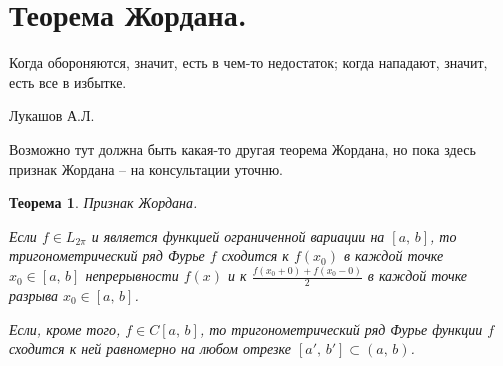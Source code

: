 \documentclass[a4paper,12pt]{article}
\theoremstyle{plain}
\newtheorem{theorem}{Теорема}[section]
\theoremstyle{definition}
\theoremstyle{remark}
\begin{document}
\section{Теорема Жордана.}

\epigraph{Когда обороняются, значит, есть в чем-то недостаток; когда нападают, значит, есть все в избытке.}{Лукашов А.Л.}

Возможно тут должна быть какая-то другая теорема Жордана, но пока здесь признак Жордана -- на консультации уточню.
\begin{theorem}
	Признак Жордана.

	Если $f \in L_{2\pi}$ и является функцией ограниченной вариации на $[a,\,b]$, то тригонометрический ряд Фурье $f$ сходится к $f(x_0)$ в каждой точке $x_0 \in [a,\,b]$ непрерывности $f(x)$ и к $\frac{f(x_0 + 0) + f(x_0 - 0)}{2}$ в каждой точке разрыва $x_0 \in [a,\,b]$.

	Если, кроме того, $f \in C[a,\,b]$, то тригонометрический ряд Фурье функции $f$ сходится к ней равномерно на любом отрезке $[a',\,b'] \subset (a,\,b)$.
\end{theorem}
\end{document}
